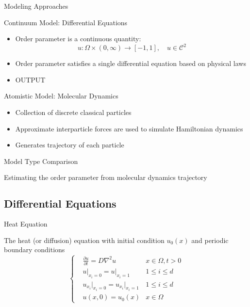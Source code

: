 \documentclass{beamer}
\theoremstyle{remark}
\begin{document}
\begin{frame}{Modeling Approaches}
	
	Continuum Model: Differential Equations
	\begin{itemize}
		\item Order parameter is a continuous quantity: \begin{equation}
			u\colon \Omega\times(0,\infty)\to[-1,1],\quad u\in\mathcal{C}^2
		\end{equation}
		\item Order parameter satisfies a single differential equation based on physical laws
		\item OUTPUT
	\end{itemize}

	Atomistic Model: Molecular Dynamics
	\begin{itemize}
		\item Collection of discrete classical particles
		\item Approximate interparticle forces are used to simulate Hamiltonian dynamics
		\item Generates trajectory of each particle
	\end{itemize}

\end{frame}

\begin{frame}{Model Type Comparison}

	Estimating the order parameter from molecular dynamics trajectory	
	
\end{frame}

\subsection{Differential Equations}

\begin{frame}{Heat Equation}
	
	The heat (or diffusion) equation with initial condition $u_0(x)$ and periodic boundary conditions
	\begin{equation} \label{eq_HE}
		\left\{
			\begin{split}
				&\frac{\partial u}{\partial t}=D\nabla^2u&x\in\Omega,t>0\\
				&u\big|_{x_i=0}=u\big|_{x_i=1}&1\le i\le d\\
				&u_{x_i}\big|_{x_i=0}=u_{x_i}\big|_{x_i=1}&1\le i\le d\\
				&u(x,0)=u_0(x)&x\in\Omega
			\end{split}	
		\right.
	\end{equation}
	
	
\end{frame}
\end{document}
